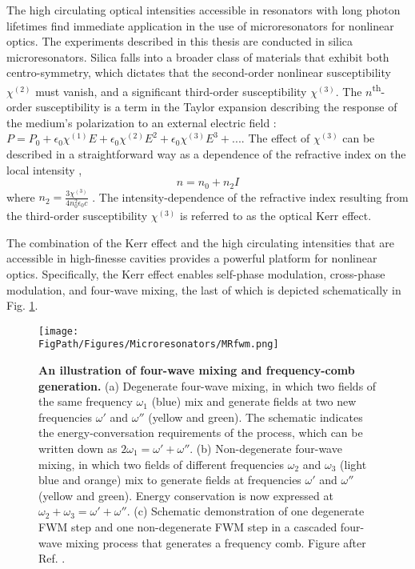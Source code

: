 The high circulating optical intensities accessible in resonators with long photon lifetimes find immediate application in the use of microresonators for nonlinear optics. The experiments described in this thesis are conducted in silica microresonators. Silica falls into a broader class of materials that exhibit both centro-symmetry, which dictates that the second-order nonlinear susceptibility $\chi^{(2)}$ must vanish, and a significant third-order susceptibility $\chi^{(3)}$. The $n$\textsuperscript{th}-order susceptibility is a term in the Taylor expansion describing the response of the medium's polarization to an external electric field \cite{Boyd2003}: $P=P_0+\epsilon_0 \chi^{(1)} E + \epsilon_0 \chi^{(2)} E^2 + \epsilon_0 \chi^{(3)} E^3+...$. The effect of $\chi^{(3)}$ can be described in a straightforward way as a dependence of the refractive index on the local intensity \cite{Agrawal2007},
\begin{equation}
n=n_0+n_2 I \label{eq:KerrIndex}
\end{equation}
where $n_2=\frac{3\chi^{(3)}}{4n_0^2\epsilon_0 c}$ \cite{DelCoso2004,Agrawal2007}. The intensity-dependence of the refractive index resulting from the third-order susceptibility $\chi^{(3)}$ is referred to as the optical Kerr effect.

The combination of the Kerr effect and the high circulating intensities that are accessible in high-finesse cavities provides a powerful platform for nonlinear optics. Specifically, the Kerr effect enables self-phase modulation, cross-phase modulation, and four-wave mixing, the last of which is depicted schematically in Fig. \ref{fig:MRfwm}. 

\begin{figure}[htpb]
	\begin{center}
		\texttt{[image: \\FigPath/Figures/Microresonators/MRfwm.png]}
	\end{center}
	\caption[An illustration of four-wave mixing and frequency-comb generation.]{\textbf{An illustration of four-wave mixing and frequency-comb generation.} (a) Degenerate four-wave mixing, in which two fields of the same frequency $\omega_1$ (blue) mix and generate fields at two new frequencies $\omega'$ and $\omega''$ (yellow and green). The schematic indicates the energy-conversation requirements of the process, which can be written down as $2\omega_1=\omega'+\omega''$. (b) Non-degenerate four-wave mixing, in which two fields of different frequencies $\omega_2$ and $\omega_3$ (light blue and orange) mix to generate fields at frequencies $\omega'$ and $\omega''$ (yellow and green). Energy conservation is now expressed at $\omega_2+\omega_3=\omega'+\omega''$. (c) Schematic demonstration of one degenerate FWM step and one non-degenerate FWM step in a cascaded four-wave mixing process that generates a frequency comb. \small{Figure after Ref. \cite{Kippenberg2011}.}}
	
	\label{fig:MRfwm}
\end{figure} 


